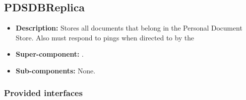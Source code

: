 \subsection{PDSDBReplica}
\begin{itemize}
    \item \textbf{Description:} Stores all documents that belong in the Personal Document Store. Also must respond to pings when directed to by the 
    \item \textbf{Super-component:} .
    \item \textbf{Sub-components:} None.
\end{itemize}

\subsubsection*{Provided interfaces}
